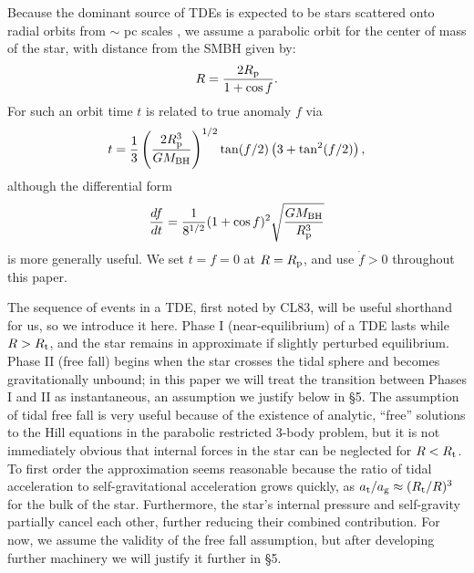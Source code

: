 \documentclass[useAMS, twocolumn, usenatbib]{mn2e}
\begin{document}
Because the dominant source of TDEs is expected to be stars scattered onto radial orbits from $\sim$ pc scales \citep{MagorrianTremaine99, WangMerritt04}, we assume a parabolic orbit for the center of mass of the star, with distance from the SMBH given by:
\begin{equation}
R=\frac{2R_{\rm p}}{1+\cos f}.
\end{equation}
For such an orbit time $t$ is related to true anomaly $f$ via
\begin{equation}
t=\frac{1}{3}\left(\frac{2R_{\rm p}^3}{GM_{\rm BH}}\right)^{1/2}\tan(f/2)\left(3+\tan ^2(f/2)\right),
\end{equation}
although the differential form
\begin{equation}
\frac{df}{dt}=\frac{1}{8^{1/2}}(1+\cos f)^2\sqrt{\frac{GM_{\rm BH}}{R_{\rm p}^3}}
\end{equation}
is more generally useful.  We set $t=f=0$ at $R=R_{\rm p}$, and use $\dot{f}>0$ throughout this paper.

The sequence of events in a TDE, first noted by CL83, will be useful shorthand for us, so we introduce it here.  Phase I  (near-equilibrium) of a TDE lasts while $R>R_{\rm t}$, and the star remains in approximate if slightly perturbed equilibrium.  Phase II (free fall) begins when the star crosses the tidal sphere and becomes gravitationally unbound; in this paper we will treat the transition between Phases I and II as instantaneous, an assumption we justify below in \S 5.  The assumption of tidal free fall is very useful because of the existence of analytic, ``free'' solutions to the Hill equations in the parabolic restricted 3-body problem, but it is not immediately obvious that internal forces in the star can be neglected for $R<R_{\rm t}$.  To first order the approximation seems reasonable because the ratio of tidal acceleration to self-gravitational acceleration grows quickly, as $a_{\rm t}/a_{\rm g}\approx (R_{\rm t}/R)^3$ for the bulk of the star.  Furthermore, the star's internal pressure and self-gravity partially cancel each other, further reducing their combined contribution.  For now, we assume the validity of the free fall assumption, but after developing further machinery we will justify it further in \S 5.
\end{document}
